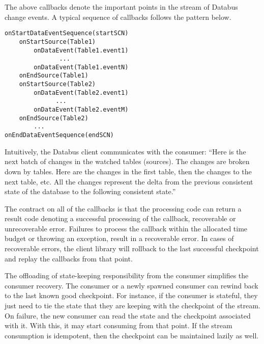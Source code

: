 The above callbacks denote the important points in the stream of Databus change events. A typical sequence of callbacks follows the pattern below.

\begin{verbatim}
onStartDataEventSequence(startSCN)
    onStartSource(Table1)
        onDataEvent(Table1.event1)
               ...
        onDataEvent(Table1.eventN) 
    onEndSource(Table1)
    onStartSource(Table2)
        onDataEvent(Table2.event1) 
              ...
        onDataEvent(Table2.eventM)
    onEndSource(Table2)
        ... 
onEndDataEventSequence(endSCN)
\end{verbatim}

Intuitively, the Databus client communicates with the consumer: ``Here is the next batch of changes in the watched tables (sources). The changes are broken down by tables. Here are the changes in the first table, then the changes to the next table, etc. All the changes represent the delta from the previous consistent state of the database to the following consistent state.''

The contract on all of the callbacks is that the processing code can return a result code denoting a successful processing of the callback, recoverable or unrecoverable error. Failures to process the callback within the allocated time budget or throwing an exception, result in a recoverable error.
In cases of recoverable errors, the client library will rollback to the last successful checkpoint and replay the callbacks from that point.

The offloading of state-keeping responsibility from the consumer simplifies the consumer recovery. The consumer or a newly spawned consumer can rewind back to the last known good checkpoint. For instance, if the consumer is stateful, they just need to tie the state that they are keeping with the checkpoint of the stream. On failure, the new consumer can read the state and the checkpoint associated with it. With this, it may start consuming from that point. If the stream consumption is idempotent, then the checkpoint can be maintained lazily as well. 


